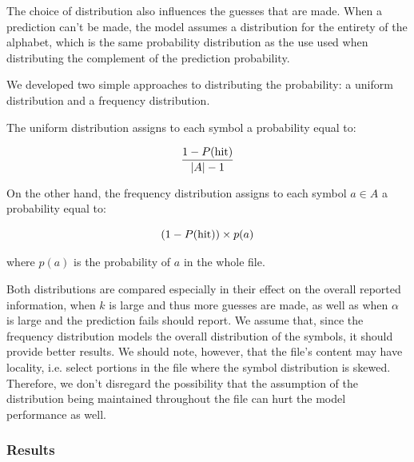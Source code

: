 \documentclass{article}
\begin{document}
The choice of distribution also influences the guesses that are made.
When a prediction can't be made, the model assumes a distribution for the entirety of the alphabet, which is the same probability distribution as the use used when distributing the complement of the prediction probability.

We developed two simple approaches to distributing the probability: a uniform distribution and a frequency distribution.

The uniform distribution assigns to each symbol a probability equal to:

$$
\frac{1 - P(\textnormal{hit})}{\vert A \vert - 1}
$$

On the other hand, the frequency distribution assigns to each symbol $a \in A$ a probability equal to:

$$
(1 - P(\textnormal{hit})) \times p(a)
$$

where $p(a)$ is the probability of $a$ in the whole file.

Both distributions are compared especially in their effect on the overall reported information, when $k$ is large and thus more guesses are made, as well as when $\alpha$ is large and the prediction fails should report.
We assume that, since the frequency distribution models the overall distribution of the symbols, it should provide better results.
We should note, however, that the file's content may have locality, i.e. select portions in the file where the symbol distribution is skewed.
Therefore, we don't disregard the possibility that the assumption of the distribution being maintained throughout the file can hurt the model performance as well.

\subsubsection{Results}
\end{document}

